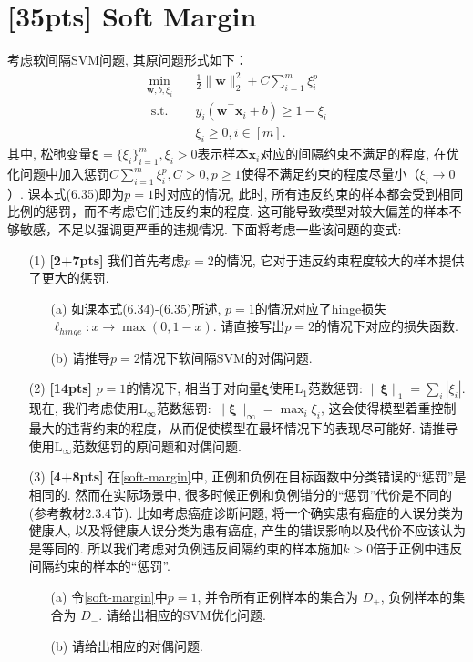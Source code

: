 \documentclass[a4paper,UTF8]{article}
\numberwithin{equation}{section}
\theoremstyle{definition}
\newcommand{\vct}[1]{\boldsymbol{#1}} %
\newcommand{\vw}{\vct{w}}
\newcommand{\vx}{\vct{x}}
\begin{document}
\section{[35pts] Soft Margin}
考虑软间隔SVM问题, 其原问题形式如下：
\begin{equation}
    \begin{aligned}
        \min _{\vw, b, \xi_{i}} \quad & \frac{1}{2}\|\vw\|_{2}^{2}+C \sum_{i=1}^{m} \xi^p_{i} \\
        \text { s.t. } \quad & y_{i}\left(\vw^{\top} \vx_{i}+b\right) \geq 1- \xi_{i} \\
        & \xi_{i} \geq 0, i \in [m] .
    \end{aligned}
    \label{soft-margin}
\end{equation}
其中, 松弛变量$\bm{\xi} = \{\xi_i\}_{i=1}^m, \xi_i > 0$表示样本$\vx_i$对应的间隔约束不满足的程度, 在优化问题中加入惩罚$C\sum_{i=1}^m \xi^p_i, C>0, p\ge 1$使得不满足约束的程度尽量小（$\xi_i\rightarrow 0$）. 课本式(6.35)即为$p=1$时对应的情况, 此时, 所有违反约束的样本都会受到相同比例的惩罚，而不考虑它们违反约束的程度. 这可能导致模型对较大偏差的样本不够敏感，不足以强调更严重的违规情况. 下面将考虑一些该问题的变式:
\begin{enumerate}
    \item[(1)] \textbf{[2+7pts]} 我们首先考虑$p=2$的情况, 它对于违反约束程度较大的样本提供了更大的惩罚. 
    \begin{enumerate}
        \item[(a)] 如课本式(6.34)-(6.35)所述, $p=1$的情况对应了hinge损失$\ell_{hinge} :x \to \max(0, 1-x)$. 请直接写出$p=2$的情况下对应的损失函数. 
        \item[(b)] 请推导$p=2$情况下软间隔SVM的对偶问题. 
    \end{enumerate}
    \item[(2)] \textbf{[14pts]} $p=1$的情况下, 相当于对向量$\bm{\xi}$使用$\mathrm{L}_1$范数惩罚: $\lVert \bm{\xi} \rVert_1 = \sum_{i}  |\xi_i|$. 现在, 我们考虑使用$\mathrm{L}_\infty$范数惩罚: $\lVert \bm{\xi} \rVert_\infty = \max_i  \xi_i $, 这会使得模型着重控制最大的违背约束的程度，从而促使模型在最坏情况下的表现尽可能好. 请推导使用$\mathrm{L}_\infty$范数惩罚的原问题和对偶问题.
    \item[(3)] \textbf{[4+8pts]} 在\eqref{soft-margin}中, 正例和负例在目标函数中分类错误的“惩罚”是相同的. 然而在实际场景中, 很多时候正例和负例错分的“惩罚”代价是不同的 (参考教材2.3.4节). 比如考虑癌症诊断问题, 将一个确实患有癌症的人误分类为健康人, 以及将健康人误分类为患有癌症, 产生的错误影响以及代价不应该认为是等同的. 所以我们考虑对负例违反间隔约束的样本施加$k>0$倍于正例中违反间隔约束的样本的“惩罚”. 
    \begin{enumerate}
        \item[(a)] 令\eqref{soft-margin}中$p=1$, 并令所有正例样本的集合为 $D_{+}$, 负例样本的集合为 $D_{-}$. 请给出相应的SVM优化问题.
        \item[(b)] 请给出相应的对偶问题.
    \end{enumerate}
\end{enumerate}
\end{document}
